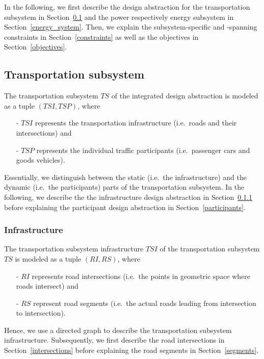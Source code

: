 In the following, we first describe the design abstraction for the transportation subsystem in Section~\ref{transport} and the power respectively energy subsystem in Section~\ref{energy_system}. Then, we explain the subsystem-specific and -spanning constraints in Section~\ref{constraints} as well as the objectives in Section~\ref{objectives}. 

\subsection{Transportation subsystem}
\label{transport}

The transportation subsystem $TS$ of the integrated design abstraction is modeled as a tuple $(TSI, TSP)$, where
\begin{itemize}
	\item[-] $TSI$ represents the transportation infrastructure (i.e.\ roads and their intersections) and
	\item[-] $TSP$ represents the individual traffic participants (i.e.\ passenger cars and goods vehicles).
\end{itemize}
Essentially, we distinguish between the static (i.e.\ the infrastructure) and the dynamic (i.e.\ the participants) parts of the transportation subsystem. In the following, we describe the the infrastructure design abstraction in Section~\ref{transport_infrastructure} before explaining the participant design abstraction in Section~\ref{participants}.

\subsubsection{Infrastructure}
\label{transport_infrastructure}

The transportation subsystem infrastructure $TSI$ of the transportation subsystem $TS$ is modeled as a tuple $(RI, RS)$, where
\begin{itemize}
	\item[-] $RI$ represents road intersections (i.e.\ the points in geometric space where roads intersect) and
	\item[-] $RS$ represent road segments (i.e.\ the actual roads leading from intersection to intersection).
\end{itemize}
Hence, we use a directed graph to describe the transportation subsystem infrastructure. Subsequently, we first describe the road intersections in Section~\ref{intersections} before explaining the road segments in Section~\ref{segments}.

